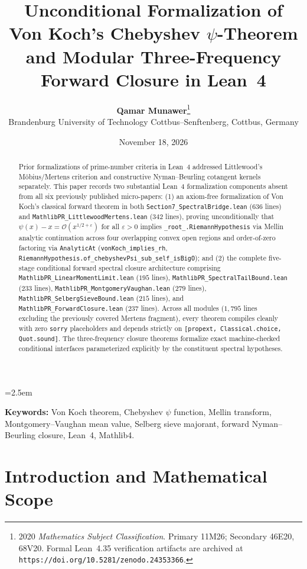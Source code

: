 \documentclass[11pt,a4paper]{article}
\title{\textbf{Unconditional Formalization of Von Koch's Chebyshev $\psi$-Theorem\\
and Modular Three-Frequency Forward Closure in Lean~4}}
\author{\textbf{Qamar Munawer}\thanks{2020 \emph{Mathematics Subject Classification}. Primary 11M26; Secondary 46E20, 68V20. Formal Lean~4.35 verification artifacts are archived at \texttt{https://doi.org/10.5281/zenodo.24353366}.}\\[0.3em]
\small Brandenburg University of Technology Cottbus--Senftenberg, Cottbus, Germany}
\date{November 18, 2026}
\theoremstyle{definition}
\begin{document}
\linespread{1.15}\selectfont
\emergencystretch=2.5em

\maketitle

\begin{abstract}
Prior formalizations of prime-number criteria in Lean~4 addressed Littlewood's M\"obius/Mertens criterion and constructive Nyman--Beurling cotangent kernels separately. This paper records two substantial Lean~4 formalization components absent from all six previously published micro-papers: (1) an axiom-free formalization of Von Koch's classical forward theorem in both \texttt{Section7\_\allowbreak SpectralBridge.lean} ($636$ lines) and \texttt{MathlibPR\_\allowbreak LittlewoodMertens.lean} ($342$ lines), proving unconditionally that $\psi(x) - x = \mathcal{O}(x^{1/2 + \varepsilon})$ for all $\varepsilon > 0$ implies \texttt{\_root\_.\allowbreak RiemannHypothesis} via Mellin analytic continuation across four overlapping convex open regions and order-of-zero factoring via \texttt{AnalyticAt} (\texttt{vonKoch\_\allowbreak implies\_\allowbreak rh}, \texttt{RiemannHypothesis.\allowbreak of\_\allowbreak chebyshevPsi\_\allowbreak sub\_\allowbreak self\_\allowbreak isBigO}); and (2) the complete five-stage conditional forward spectral closure architecture comprising \texttt{MathlibPR\_\allowbreak LinearMomentLimit.lean} ($195$ lines), \texttt{MathlibPR\_\allowbreak SpectralTailBound.lean} ($233$ lines), \texttt{MathlibPR\_\allowbreak MontgomeryVaughan.lean} ($279$ lines), \texttt{MathlibPR\_\allowbreak SelbergSieveBound.lean} ($215$ lines), and \texttt{MathlibPR\_\allowbreak ForwardClosure.lean} ($237$ lines). Across all modules ($1{,}795$ lines excluding the previously covered Mertens fragment), every theorem compiles cleanly with zero \texttt{sorry} placeholders and depends strictly on \texttt{[propext, Classical.choice, Quot.sound]}. The three-frequency closure theorems formalize exact machine-checked conditional interfaces parameterized explicitly by the constituent spectral hypotheses.
\end{abstract}

\noindent\textbf{Keywords:} Von Koch theorem, Chebyshev $\psi$ function, Mellin transform, Montgomery--Vaughan mean value, Selberg sieve majorant, forward Nyman--Beurling closure, Lean~4, Mathlib4.

\section{Introduction and Mathematical Scope}
\end{document}
